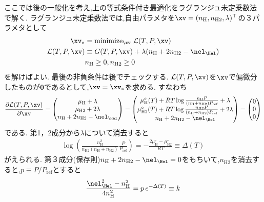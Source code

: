 ここでは後の一般化を考え,上の等式条件付き最適化をラグランジュ未定乗数法で解く. ラグランジュ未定乗数法では,自由パラメタを$\xv = ( n_\mathrm{H},  n_\mathrm{H2}, \lambda )^\top$の３パラメタとして
\begin{align}
\label{eq:opt2tce}
    \xv_\ast &= \mathrm{minimize}_{\xv} \,\, \mathcal{L} (T, P, \xv) \\ 
    \mathcal{L} (T, P, \xv) &\equiv G(T, P, \xv) + \lambda (n_\mathrm{H} + 2 n_\mathrm{H2} -  \nel_{\Hel} ) \\
    \label{eq:nonnegative_tce}
    &n_\mathrm{H} \ge 0, n_\mathrm{H2} \ge 0
\end{align}
を解けばよい. 最後の非負条件は後でチェックする. $\mathcal{L} (T, P, \xv)$を$\xv$で偏微分したものが$\boldsymbol{0}$であるとして,$\xv=\xv_\ast$を求める. すなわち
\begin{align}
\frac{\partial \mathcal{L} (T, P, \xv)}{\partial \xv} = 
\begin{pmatrix}
    \mu_\mathrm{H} + \lambda \\
    \mu_\mathrm{H2} + 2 \lambda \\
    n_\mathrm{H} + 2 n_\mathrm{H2} -  \nel_{\Hel} 
\end{pmatrix}
=
\displaystyle{
\begin{pmatrix}
    \mu_\mathrm{H}^\circ(T) + RT \log{\frac{n_\mathrm{H} P}{(n_\mathrm{H} + n_\mathrm{H2}) P_\mathrm{ref}}}  + \lambda \\
    \mu_\mathrm{H2}^\circ(T) + RT\log{\frac{n_\mathrm{H2} P}{(n_\mathrm{H} + n_\mathrm{H2}) P_\mathrm{ref}}} + 2 \lambda \\
    n_\mathrm{H} + 2 n_\mathrm{H2} -  \nel_{\Hel} 
\end{pmatrix}
}
=
\begin{pmatrix}
    0 \\
    0 \\
    0
\end{pmatrix}
\end{align}
である. 第1，2成分から$\lambda$について消去すると
\begin{align}
    \log{\left( \frac{n_\mathrm{H}^2 }{n_\mathrm{H2} (n_\mathrm{H} + n_\mathrm{H2})} \frac{P}{P_\mathrm{ref}} \right)} =- \frac{2 \mu_\mathrm{H}^\circ - \mu_\mathrm{H2}^\circ}{RT} \equiv \Delta (T)
\end{align}
がえられる. 第３成分(保存則)$n_\mathrm{H} + 2 n_\mathrm{H2} - \nel_{\Hel}=0$をもちいて,$n_\mathrm{H2}$を消去すると,$p \equiv P/P_\mathrm{ref}$とすると
\begin{align}
\label{eq:kdef}
\frac{ \nel_{\Hel}^2 - n_\mathrm{H}^2}{4 n_\mathrm{H}^2} = p \, e^{-\Delta (T)} \equiv k
\end{align}
